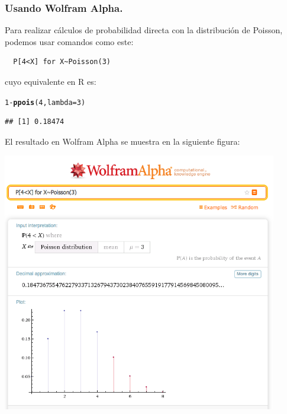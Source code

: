 \documentclass[10pt,a4paper]{article}\usepackage[]{graphicx}\usepackage[]{color}
\makeatletter
\newcommand{\hlnum}[1]{\textcolor[rgb]{0.686,0.059,0.569}{#1}}%
\newcommand{\hlopt}[1]{\textcolor[rgb]{0,0,0}{#1}}%
\newcommand{\hlstd}[1]{\textcolor[rgb]{0.345,0.345,0.345}{#1}}%
\newcommand{\hlkwc}[1]{\textcolor[rgb]{0.333,0.667,0.333}{#1}}%
\newcommand{\hlkwd}[1]{\textcolor[rgb]{0.737,0.353,0.396}{\textbf{#1}}}%
\newenvironment{kframe}{%
 \def\at@end@of@kframe{}%
 \ifinner\ifhmode%
  \def\at@end@of@kframe{\end{minipage}}%
  \begin{minipage}{\columnwidth}%
 \fi\fi%
 \def\FrameCommand##1{\hskip\@totalleftmargin \hskip-\fboxsep
 \colorbox{shadecolor}{##1}\hskip-\fboxsep
     \hskip-\linewidth \hskip-\@totalleftmargin \hskip\columnwidth}%
 \MakeFramed {\advance\hsize-\width
   \@totalleftmargin\z@ \linewidth\hsize
   \@setminipage}}%
 {\par\unskip\endMakeFramed%
 \at@end@of@kframe}
\newenvironment{knitrout}{}{} %
\makeatother
\begin{document}
\subsubsection*{Usando Wolfram Alpha.}

Para realizar cálculos de probabilidad directa con la distribución de Poisson, podemos usar comandos como este:
\begin{verbatim}
  P[4<X] for X~Poisson(3)
\end{verbatim}
cuyo equivalente en R es:
\begin{knitrout}
\color{fgcolor}\begin{kframe}
\begin{alltt}
\hlnum{1} \hlopt{-} \hlkwd{ppois}\hlstd{(}\hlnum{4}\hlstd{,} \hlkwc{lambda}\hlstd{=}\hlnum{3}\hlstd{)}
\end{alltt}
\begin{verbatim}
## [1] 0.18474
\end{verbatim}
\end{kframe}
\end{knitrout}
El resultado en Wolfram Alpha se muestra en la siguiente figura:
\begin{center}
    \includegraphics[width=12cm]{../fig/Tut08-03.png}
\end{center}
\end{document}
